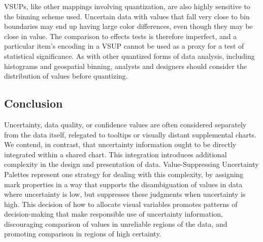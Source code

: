 VSUPs, like other mappings involving quantization, are also highly sensitive to the binning scheme used. Uncertain data with values that fall very close to bin boundaries may end up having large color differences, even though they may be close in value. The comparison to effects tests is therefore imperfect, and a particular item's encoding in a VSUP cannot be used as a proxy for a test of statistical significance. As with other quantized forms of data analysis, including histograms and geospatial binning, analysts and designers should consider the distribution of values before quantizing.

\subsection{Conclusion}

Uncertainty, data quality, or confidence values are often considered separately from the data itself, relegated to tooltips or visually distant supplemental charts. We contend, in contrast, that uncertainty information ought to be directly integrated within a shared chart. This integration introduces additional complexity in the design and presentation of data. Value-Suppressing Uncertainty Palettes represent one strategy for dealing with this complexity, by assigning mark properties in a way that supports the disambiguation of values in data where uncertainty is low, but suppresses these judgments when uncertainty is high. This decision of how to allocate visual variables promotes patterns of decision-making that make responsible use of uncertainty information, discouraging comparison of values in unreliable regions of the data, and promoting comparison in regions of high certainty.
